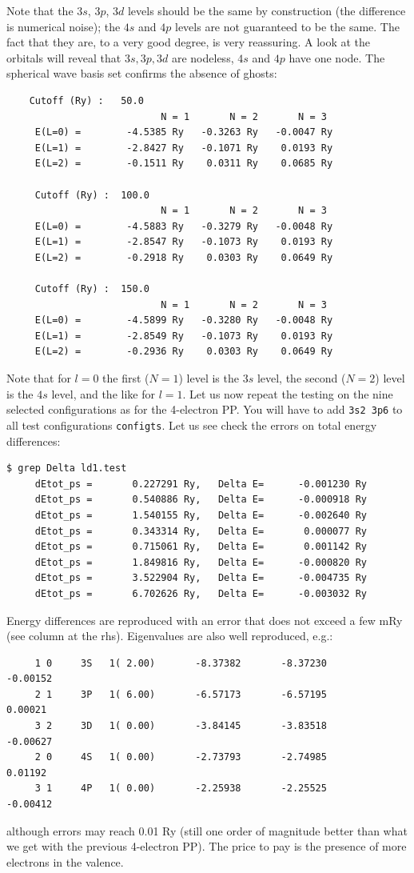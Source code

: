\documentclass[12pt,a4paper]{article}
\begin{document}
Note that the $3s$, $3p$, $3d$ levels should be the same by construction
(the difference is numerical noise); the $4s$ and $4p$ levels are not
guaranteed to be the same. The fact that they are, to a very good degree,
is very reassuring. A look at the orbitals will reveal that $3s, 3p, 3d$
are nodeless, $4s$ and $4p$ have one node. The spherical wave basis 
set confirms the absence of ghosts:
\begin{verbatim}
    Cutoff (Ry) :   50.0
                           N = 1       N = 2       N = 3
     E(L=0) =        -4.5385 Ry   -0.3263 Ry   -0.0047 Ry
     E(L=1) =        -2.8427 Ry   -0.1071 Ry    0.0193 Ry
     E(L=2) =        -0.1511 Ry    0.0311 Ry    0.0685 Ry

     Cutoff (Ry) :  100.0
                           N = 1       N = 2       N = 3
     E(L=0) =        -4.5883 Ry   -0.3279 Ry   -0.0048 Ry
     E(L=1) =        -2.8547 Ry   -0.1073 Ry    0.0193 Ry
     E(L=2) =        -0.2918 Ry    0.0303 Ry    0.0649 Ry

     Cutoff (Ry) :  150.0
                           N = 1       N = 2       N = 3
     E(L=0) =        -4.5899 Ry   -0.3280 Ry   -0.0048 Ry
     E(L=1) =        -2.8549 Ry   -0.1073 Ry    0.0193 Ry
     E(L=2) =        -0.2936 Ry    0.0303 Ry    0.0649 Ry
\end{verbatim}
Note that for $l=0$ the first ($N=1$) level is the $3s$ level, 
the second ($N=2$) level is the $4s$ level, and the like for 
$l=1$. Let us now repeat the testing on the nine
selected configurations as for the 4-electron PP. You will
have to add \texttt{3s2 3p6} to all test configurations
\texttt{configts}. Let us see check the errors on total energy 
differences:
\begin{verbatim}
$ grep Delta ld1.test
     dEtot_ps =       0.227291 Ry,   Delta E=      -0.001230 Ry
     dEtot_ps =       0.540886 Ry,   Delta E=      -0.000918 Ry
     dEtot_ps =       1.540155 Ry,   Delta E=      -0.002640 Ry
     dEtot_ps =       0.343314 Ry,   Delta E=       0.000077 Ry
     dEtot_ps =       0.715061 Ry,   Delta E=       0.001142 Ry
     dEtot_ps =       1.849816 Ry,   Delta E=      -0.000820 Ry
     dEtot_ps =       3.522904 Ry,   Delta E=      -0.004735 Ry
     dEtot_ps =       6.702626 Ry,   Delta E=      -0.003032 Ry
\end{verbatim}
Energy differences are reproduced with an
error that does not exceed a few mRy (see column at the rhs). 
Eigenvalues are also well reproduced, e.g.:
\begin{verbatim}
     1 0     3S   1( 2.00)       -8.37382       -8.37230       -0.00152
     2 1     3P   1( 6.00)       -6.57173       -6.57195        0.00021
     3 2     3D   1( 0.00)       -3.84145       -3.83518       -0.00627
     2 0     4S   1( 0.00)       -2.73793       -2.74985        0.01192
     3 1     4P   1( 0.00)       -2.25938       -2.25525       -0.00412
\end{verbatim}
although errors may reach 0.01 Ry (still one order of magnitude 
better than what we get with the previous 4-electron PP). The price 
to pay is the presence of more electrons in the valence.
\newpage
\end{document}
